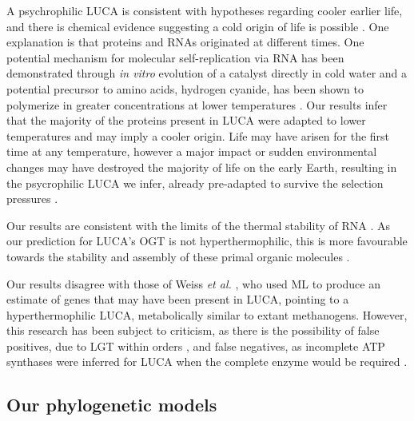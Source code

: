 A psychrophilic LUCA is consistent with hypotheses regarding cooler earlier life, and there is chemical evidence suggesting a cold origin of life is possible \cite{miller1995origin}. One explanation is that proteins and RNAs originated at different times. One potential mechanism for molecular self-replication via RNA has been demonstrated through \textit{in vitro} evolution of a catalyst directly in cold water \cite{attwater2013ice} and a potential precursor to amino acids, hydrogen cyanide, has been shown to polymerize in greater concentrations at lower temperatures \cite{miyakawa2002cold}. Our results infer that the majority of the proteins present in LUCA were adapted to lower temperatures and may imply a cooler origin. Life may have arisen for the first time at any temperature, however a major impact or sudden environmental changes may have destroyed the majority of life on the early Earth, resulting in the psycrophilic LUCA we infer, already pre-adapted to survive the selection pressures \cite{schwartzman2004hyperthermophilic}.

Our results are consistent with the limits of the thermal stability of RNA \cite{martin2003origins}. As our prediction for LUCA's OGT is not hyperthermophilic, this is more favourable towards the stability and assembly of these primal organic molecules \cite{martin2003origins,moulton2000rna}.

Our results disagree with those of Weiss \textit{et al.} \cite{weiss2016}, who used ML to produce an estimate of genes that may have been present in LUCA, pointing to a hyperthermophilic LUCA, metabolically similar to extant methanogens. However, this research has been subject to criticism, as there is the possibility of false positives, due to LGT within orders \cite{gogarten2016luca}, and false negatives, as incomplete ATP synthases were inferred for LUCA when the complete enzyme would be required \cite{gogarten2016luca}.

\subsection{Our phylogenetic models}

